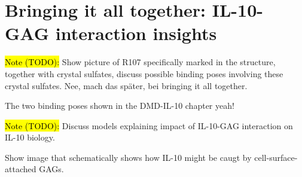 \chapter{Bringing it all together: IL-10-GAG interaction insights}
\lipsum[1-10]


\hl{Note (TODO):}
Show picture of R107 specifically marked in the structure, together with
crystal sulfates, discuss possible binding poses involving these crystal
sulfates. Nee, mach das später, bei bringing it all together.

The two binding poses shown in the DMD-IL-10 chapter yeah!


\hl{Note (TODO):}
Discuss models explaining impact of IL-10-GAG interaction on IL-10 biology.

Show image that schematically shows how IL-10 might be caugt by cell-surface-attached GAGs.

